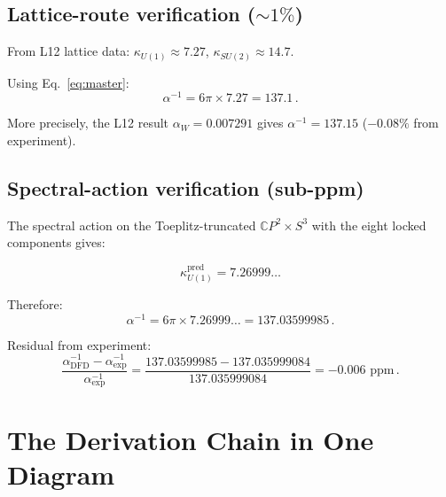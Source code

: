 \documentclass[12pt,a4paper]{article}
\begin{document}
\subsection{Lattice-route verification ($\sim 1\%$)}

From L12 lattice data: $\kappa_{U(1)} \approx 7.27$, $\kappa_{SU(2)} \approx 14.7$.

Using Eq.~\eqref{eq:master}:
\begin{equation}
\alpha^{-1} = 6\pi \times 7.27 = 137.1\,.
\end{equation}

More precisely, the L12 result $\alpha_W = 0.007291$ gives
$\alpha^{-1} = 137.15$ ($-0.08\%$ from experiment).

\subsection{Spectral-action verification (sub-ppm)}

The spectral action on the Toeplitz-truncated $\mathbb{C}P^2 \times S^3$
with the eight locked components gives:

\begin{equation}
\kappa_{U(1)}^{\mathrm{pred}} = 7.26999\ldots
\end{equation}

Therefore:
\begin{equation}
\alpha^{-1} = 6\pi \times 7.26999\ldots = 137.03599985\,.
\end{equation}

\noindent Residual from experiment:
\begin{equation}
\frac{\alpha^{-1}_{\mathrm{DFD}} - \alpha^{-1}_{\mathrm{exp}}}
     {\alpha^{-1}_{\mathrm{exp}}}
= \frac{137.03599985 - 137.035999084}{137.035999084}
= -0.006\text{ ppm}\,.
\end{equation}

\section{The Derivation Chain in One Diagram}
\label{sec:diagram}
\end{document}
